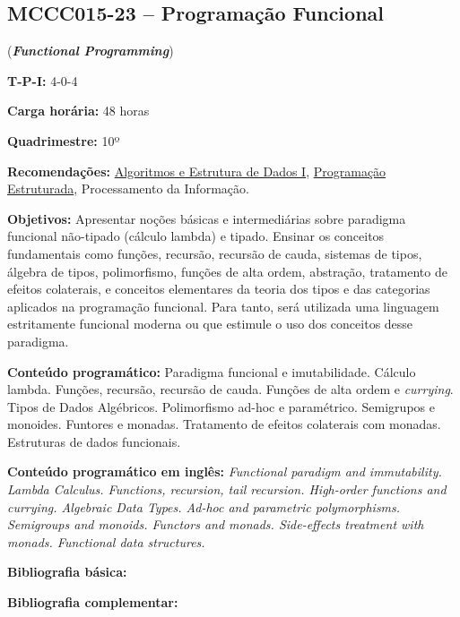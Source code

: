 \documentclass[class=article, crop=false]{standalone}
\begin{document}
\subsection*{MCCC015-23 -- Programação Funcional}
\label{disc:pf}

(\textbf{\textit{Functional Programming}})

\begin{center}
    \begin{minipage}{0.85\textwidth}
        \textbf{T-P-I:} 4-0-4
        
        \textbf{Carga horária:} 48 horas
        
        \textbf{Quadrimestre:} 10º
        
        \textbf{Recomendações:} 
        \hyperref[disc:aedI]{Algoritmos e Estrutura de Dados I},
        \hyperref[disc:pe]{Programação Estruturada},
        Processamento da Informação.
    \end{minipage}
\end{center}

\textbf{Objetivos:}
Apresentar noções básicas e intermediárias sobre paradigma funcional não-tipado
(cálculo lambda) e tipado. Ensinar os conceitos fundamentais como funções,
recursão, recursão de cauda, sistemas de tipos, álgebra de tipos, polimorfismo,
funções de alta ordem, abstração, tratamento de efeitos colaterais, e conceitos
elementares da teoria dos tipos e das categorias aplicados na programação
funcional. Para tanto, será utilizada uma linguagem estritamente funcional
moderna ou que estimule o uso dos conceitos desse paradigma.

\textbf{Conteúdo programático:}
Paradigma funcional e imutabilidade.
Cálculo lambda.
Funções, recursão, recursão de cauda.
Funções de alta ordem e \textit{currying}.
Tipos de Dados Algébricos.
Polimorfismo ad-hoc e paramétrico.
Semigrupos e monoides.
Funtores e monadas.
Tratamento de efeitos colaterais com monadas.
Estruturas de dados funcionais.

\textbf{Conteúdo programático em inglês:}
\textit{Functional paradigm and immutability.
Lambda Calculus.
Functions, recursion, tail recursion.
High-order functions and currying.
Algebraic Data Types.
Ad-hoc and parametric polymorphisms.
Semigroups and monoids.
Functors and monads.
Side-effects treatment with monads.
Functional data structures.}

\newrefsection
\textbf{Bibliografia básica:}
\nocite{1994-wadler-etal,1998-okasaki,2016-hutton}
\printbibliography

\newrefsection
\textbf{Bibliografia complementar:}
\nocite{2020-wadler,2009-dybvig,2009-sullivan-etal,2021-hickey-etal,2009-cesarini-etal}
\printbibliography
\end{document}
